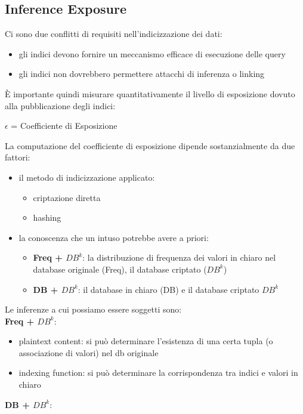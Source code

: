 \subsection{Inference Exposure}
Ci sono due conflitti di requisiti nell'indicizzazione dei dati:
\begin{itemize}
    \item gli indici devono fornire un meccanismo efficace di esecuzione delle query
    \item gli indici non dovrebbero permettere attacchi di inferenza o linking
\end{itemize}
È importante quindi misurare quantitativamente il livello di esposizione dovuto alla pubblicazione degli indici:\\
\begin{center}
    \( \epsilon\) = Coefficiente di Esposizione \\
\end{center}
La computazione del coefficiente di esposizione dipende sostanzialmente da due fattori:
\begin{itemize}
    \item il metodo di indicizzazione applicato:
    \begin{itemize}
        \item criptazione diretta
        \item hashing
    \end{itemize}
    \item la conoscenza che un intuso potrebbe avere a priori:
    \begin{itemize}
        \item \textbf{Freq + \(DB^k\)}: la distribuzione di frequenza dei valori in chiaro nel database originale (Freq), il database criptato (\(DB^k\))
        \item \textbf{DB + \(DB^k\)}: il database in chiaro (DB) e il database criptato \(DB^k\)
    \end{itemize}
\end{itemize}
Le inferenze a cui possiamo essere soggetti sono:\\
\textbf{Freq + \(DB^k\)}:
\begin{itemize}
    \item plaintext content: si può determinare l'esistenza di una certa tupla (o associazione di valori) nel db originale
    \item indexing function: si può determinare la corrispondenza tra indici e valori in chiaro
\end{itemize}
\textbf{DB + \(DB^k\)}:
